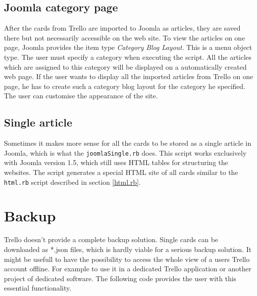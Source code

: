 \subsection{Joomla category page}

After the cards from Trello are imported to Joomla as articles, they are saved there but not necessarily accessible on the web site. To view the articles on one page, Joomla provides the item type \emph{Category Blog Layout}. This is a menu object type. The user must specify a category when executing the script. All the articles which are assigned to this category will be displayed on a automatically created web page. If the user wants to display all the imported articles from Trello on one page, he has to create such a category blog layout for the category he specified. The user can customise the appearance of the site.

\subsection{Single article}
Sometimes it makes more sense for all the cards to be stored as a single article in Joomla, which is what the \texttt{joomlaSingle.rb} does. This script works exclusively with Joomla version 1.5, which still uses HTML tables for structuring the websites. The script generates a special HTML site of all cards similar to the \texttt{html.rb} script described in section \ref{html.rb}.




\section{Backup}

Trello doesn't provide a complete backup solution. Single cards can be downloaded as *.json files, which is hardly viable for a serious backup solution. It might be usefull to have the possibility to access the whole view of a users Trello account offline. For example to use it in a dedicated Trello application or another project of dedicated software. The following code provides the user with this essential functionality.

